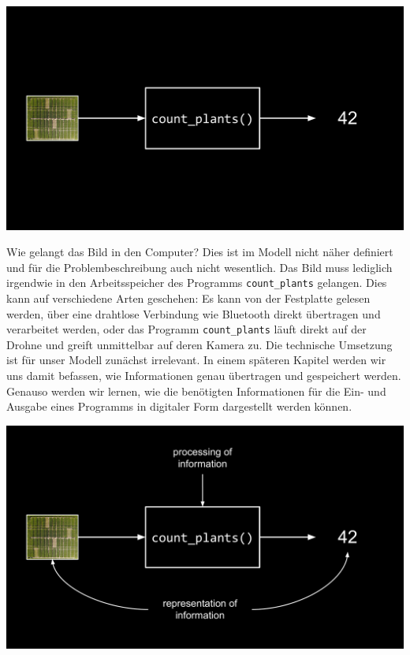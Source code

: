 \documentclass[
  ngerman,
  letterpaper,
  DIV=11]{scrreprt}
\begin{document}
\begin{center}
\includegraphics[width=1\linewidth,height=\textheight,keepaspectratio]{problem-solving_files/mediabag/problem_solving_exam12.png}
\end{center}

Wie gelangt das Bild in den Computer? Dies ist im Modell nicht näher
definiert und für die Problembeschreibung auch nicht wesentlich. Das
Bild muss lediglich irgendwie in den Arbeitsspeicher des Programms
\texttt{count\_plants} gelangen. Dies kann auf verschiedene Arten
geschehen: Es kann von der Festplatte gelesen werden, über eine
drahtlose Verbindung wie Bluetooth direkt übertragen und verarbeitet
werden, oder das Programm \texttt{count\_plants} läuft direkt auf der
Drohne und greift unmittelbar auf deren Kamera zu. Die technische
Umsetzung ist für unser Modell zunächst irrelevant. In einem späteren
Kapitel werden wir uns damit befassen, wie Informationen genau
übertragen und gespeichert werden. Genauso werden wir lernen, wie die
benötigten Informationen für die Ein- und Ausgabe eines Programms in
digitaler Form dargestellt werden können.

\begin{center}
\includegraphics[width=1\linewidth,height=\textheight,keepaspectratio]{problem-solving_files/mediabag/problem_solving_exam123.png}
\end{center}
\end{document}
